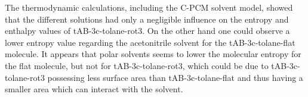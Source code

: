 \begin{comment}
-MO of tolane rather unaffected for both 1c and 3c
- pi AB energy increases while pi* AB energy decreases until the gap is as low as 3.95 eV (1c) and $INSERT_HOMO_LUMO_GAP$ (3c)
-For 3c: pi*(cAB) > pi*(cis-tol) but pi*(tAB) < pi*(trans-tol)
=> could have implications for reactions targeting the as an electrophile or nucleophile
\end{comment}
%
The thermodynamic calculations, including the C-PCM solvent model, showed that the different solutions had only a negligible influence on the entropy and enthalpy values of tAB-3c-tolane-rot3. On the other hand one could observe a lower entropy value regarding the acetonitrile solvent for the tAB-3c-tolane-flat molecule. It appears that polar solvents seems to lower the molecular entropy for the flat molecule, but not for tAB-3c-tolane-rot3, which could be due to tAB-3c-tolane-rot3 possessing less surface area than tAB-3c-tolane-flat and thus having a smaller area which can interact with the solvent. \\

%
%
\begin{comment}
-tAB-3c-tolane-rot3 quite similar Enthalpy and entropy in all solutions
-tAB-3-tolane-flat no big change in enthalpy
-tAB-3c-tolane-flat lower entropy in entropy in MeCN and DCM but not in toluene
=> polar solvents seem restrict the movement of the flat molecule more than non polar solvents resulting in a lower molecular entropy
=> effect not visible for tAB-3c-tolane-rot9 could be due to less area to interact with
\end{comment}